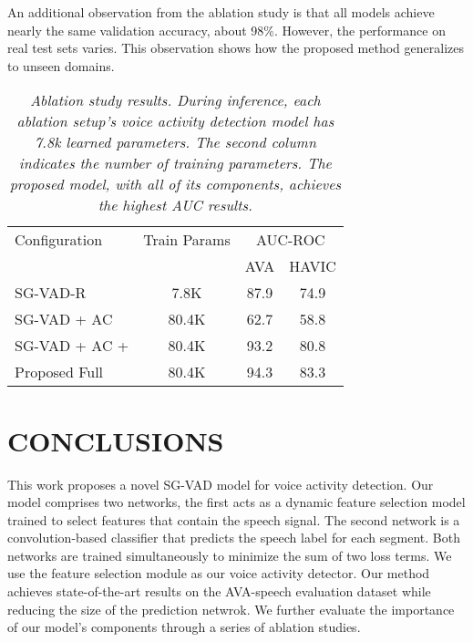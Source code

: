 \documentclass{article}
\begin{document}
An additional observation from the ablation study is that all models achieve nearly the same validation accuracy, about 98\%. However, the performance on real test sets varies. This observation shows how the proposed method generalizes to unseen domains.

\begin{table}[h!]
  \small{
    \begin{tabular}{|l|c|c|c|}
    \hline
        Configuration & Train Params  & \multicolumn{2}{c|}{AUC-ROC}  \\
    
    &  & AVA & HAVIC\\
    \hline
    \hline
    SG-VAD-R  & 7.8K &  87.9  &  74.9  \\
    SG-VAD + AC & 80.4K & 62.7 & 58.8 \\
    SG-VAD + AC +  & 80.4K & 93.2 & 80.8 \\
    \hline
    Proposed Full & 80.4K & 94.3 & 83.3 \\
    \hline
    \end{tabular}
    }
  \caption{\textit{Ablation study results. During inference, each ablation setup's voice activity detection model has 7.8k learned parameters. The second column indicates the number of training parameters. The proposed model, with all of its components, achieves the highest AUC results.}} 
   \label{tab:ablation}
\end{table}


\section{CONCLUSIONS}
\label{sec:conclusions}
This work proposes a novel SG-VAD model for voice activity detection. Our model comprises two networks, the first acts as a dynamic feature selection model trained to select features that contain the speech signal. The second network is a convolution-based classifier that predicts the speech label for each segment. Both networks are trained simultaneously to minimize the sum of two loss terms. We use the feature selection module as our voice activity detector. Our method achieves state-of-the-art results on the AVA-speech evaluation dataset while reducing the size of the prediction netwrok. We further evaluate the importance of our model's components through a series of ablation studies. 
\balance


\end{document}
